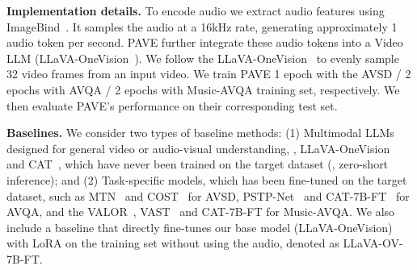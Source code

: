 
\medskip
\noindent\textbf{Implementation details.} 
To encode audio we extract audio features using ImageBind~\cite{girdhar2023imagebind}. It samples the audio at a 16kHz rate, generating approximately 1 audio token per second. PAVE further integrate these audio tokens into a Video LLM (LLaVA-OneVision~\cite{li2024llava}). We follow the LLaVA-OneVision~\cite{li2024llava} to evenly sample 32 video frames from an input video.
We train PAVE 1 epoch with the AVSD / 2 epochs with AVQA / 2 epochs with Music-AVQA training set, respectively. We then evaluate PAVE's performance on their corresponding test set. 

\medskip
\noindent\textbf{Baselines.}
We consider two types of baseline methods: 
(1) Multimodal LLMs designed for general video or audio-visual understanding, \eg, LLaVA-OneVision~\cite{li2024llava} and CAT~\cite{ye2024catenhancingmultimodallarge}, which have never been trained on the target dataset (\ie, zero-short inference); and 
(2) Task-specific models, which has been fine-tuned on the target dataset, such as MTN~\cite{Le_2019} and COST~\cite{pham2022videodialogconversationobjects} for AVSD, PSTP-Net~\cite{li2023progressive} and CAT-7B-FT~\cite{ye2024catenhancingmultimodallarge} for AVQA, and the VALOR~\cite{chen2023valor}, VAST~\cite{chen2023vast} and CAT-7B-FT for Music-AVQA. 
%
We also include a baseline that directly fine-tunes our base model (LLaVA-OneVision) with LoRA on the training set without using the audio, denoted as LLaVA-OV-7B-FT. 


